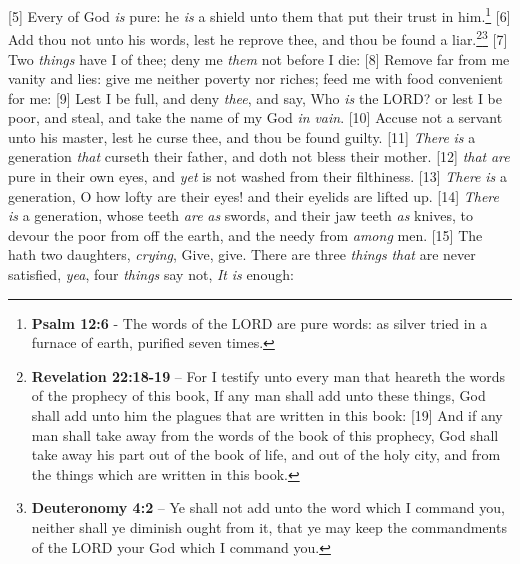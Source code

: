 [5] \textcolor[cmyk]{0.99998,1,0,0}{Every  of God \emph{is} pure: he \emph{is} a shield unto them that put their trust in him.}\footnote{\textbf{Psalm 12:6} - The words of the LORD are pure words: as silver tried in a furnace of earth, purified seven times.}
[6] \textcolor[cmyk]{0.99998,1,0,0}{Add thou not unto his words, lest he reprove thee, and thou be found a liar.}\footnote{\textbf{Revelation 22:18-19} -- For I testify unto every man that heareth the words of the prophecy of this book, If any man shall add unto these things, God shall add unto him the plagues that are written in this book: [19] And if any man shall take away from the words of the book of this prophecy, God shall take away his part out of the book of life, and out of the holy city, and from the things which are written in this book.}\footnote{\textbf{Deuteronomy 4:2} -- Ye shall not add unto the word which I command you, neither shall ye diminish ought from it, that ye may keep the commandments of the LORD your God which I command you.}
[7] \textcolor[cmyk]{0.99998,1,0,0}{Two \emph{things} have I  of thee; deny me \emph{them} not before I die:}
[8] \textcolor[cmyk]{0.99998,1,0,0}{Remove far from me vanity and lies: give me neither poverty nor riches; feed me with food convenient for me:}
[9] \textcolor[cmyk]{0.99998,1,0,0}{Lest I be full, and deny \emph{thee}, and say, Who \emph{is} the LORD? or lest I be poor, and steal, and take the name of my God \emph{in} \emph{vain}.}
[10] \textcolor[cmyk]{0.99998,1,0,0}{Accuse not a servant unto his master, lest he curse thee, and thou be found guilty.}
[11] \textcolor[cmyk]{0.99998,1,0,0}{\emph{There} \emph{is} a generation \emph{that} curseth their father, and doth not bless their mother.}
[12] \textcolor[cmyk]{0.99998,1,0,0}{ \emph{that} \emph{are} pure in their own eyes, and \emph{yet} is not washed from their filthiness.}
[13] \textcolor[cmyk]{0.99998,1,0,0}{\emph{There} \emph{is} a generation, O how lofty are their eyes! and their eyelids are lifted up.}
[14] \textcolor[cmyk]{0.99998,1,0,0}{\emph{There} \emph{is} a generation, whose teeth \emph{are} \emph{as} swords, and their jaw teeth \emph{as} knives, to devour the poor from off the earth, and the needy from \emph{among} men.}
[15] \textcolor[cmyk]{0.99998,1,0,0}{The  hath two daughters, \emph{crying}, Give, give. There are three \emph{things} \emph{that} are never satisfied, \emph{yea}, four \emph{things} say not, \emph{It} \emph{is} enough:}
